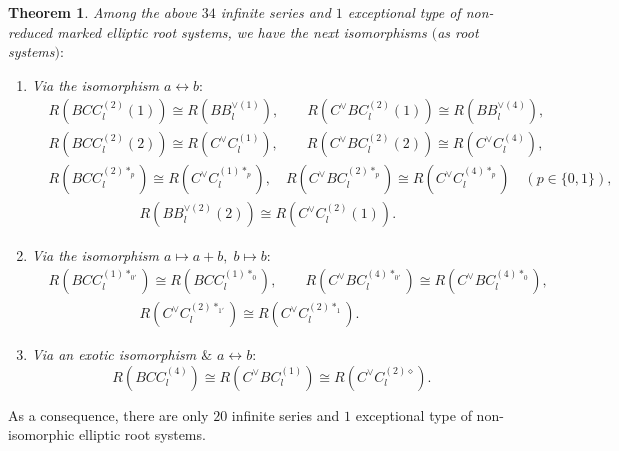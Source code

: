 \documentclass[11pt]{amsart}
\newtheorem{thm}{Theorem}[section]
\begin{document}
\begin{thm} \label{thm:isom-nred-mERS-nred_root-sys}Among the above $34$ infinite series and $1$ exceptional type of non-reduced marked elliptic root systems, we have the next isomorphisms $($as root systems$):$
\begin{enumerate}
\item Via the isomorphism $a \leftrightarrow b:$
\begin{align*}
&R(BCC_l^{(2)}(1)) \cong R(BB_l^{\vee (1)}), \qquad 
  R(C^\vee BC_l^{(2)}(1)) \cong R(BB_l^{\vee (4)}), \\
&R(BCC_l^{(2)}(2)) \cong R(C^\vee C_l^{(1)}), \qquad 
  R(C^\vee BC_l^{(2)}(2)) \cong R(C^\vee C_l^{(4)}), \\
&R(BCC_l^{(2)\ast_p}) \cong R(C^\vee C_l^{(1)\ast_p}), \quad
  R(C^\vee BC_l^{(2)\ast_p}) \cong R(C^\vee C_l^{(4)\ast_p}) \quad (p \in \{0,1\}), \\
&\phantom{ABCDEFGHI} R(BB_l^{\vee (2)}(2)) \cong R(C^\vee C_l^{(2)}(1)).
\end{align*}
\item Via the isomorphism $a \mapsto a+b, \; b \mapsto b:$
\begin{align*}
&R(BCC_l^{(1)\ast_{0'}}) \cong R(BCC_l^{(1)\ast_0}), \qquad
  R(C^\vee BC_l^{(4)\ast_{0'}}) \cong R(C^\vee BC_l^{(4)\ast_0}), \\
&\phantom{ABCDEFGHI} R(C^\vee C_l^{(2)\ast_{1'}}) \cong R(C^\vee C_l^{(2)\ast_1}).
\end{align*}
\item Via an exotic isomorphism $\&$ $a \leftrightarrow b:$
\[ R(BCC_l^{(4)}) \cong R(C^\vee BC_l^{(1)}) \cong R(C^\vee C_l^{(2)\diamond}). \]
\end{enumerate}
\end{thm}
As a consequence, there are only $20$ infinite series and $1$ exceptional type of non-isomorphic elliptic root systems.
\vskip 0.2in
\end{document}
